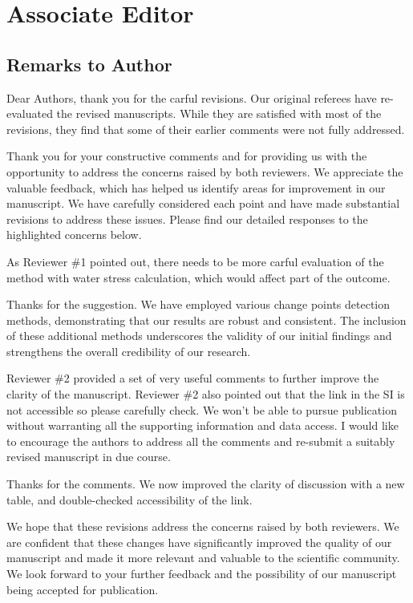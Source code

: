 \section*{Associate Editor}\label{editor}

\subsection{Remarks to Author}

\RC{} Dear Authors, thank you for the carful revisions. Our original referees have re-evaluated the revised manuscripts. While they are satisfied with most of the revisions, they find that some of their earlier comments were not fully addressed.

\AR{} Thank you for your constructive comments and for providing us with the opportunity to address the concerns raised by both reviewers. We appreciate the valuable feedback, which has helped us identify areas for improvement in our manuscript. We have carefully considered each point and have made substantial revisions to address these issues. Please find our detailed responses to the highlighted concerns below.

\RC{} As Reviewer \#1 pointed out, there needs to be more carful evaluation of the method with water stress calculation, which would affect part of the outcome.

\AR{} Thanks for the suggestion. We have employed various change points detection methods, demonstrating that our results are robust and consistent. The inclusion of these additional methods underscores the validity of our initial findings and strengthens the overall credibility of our research.

\RC{} Reviewer \#2 provided a set of very useful comments to further improve the clarity of the manuscript. Reviewer \#2 also pointed out that the link in the SI is not accessible so please carefully check. We won't be able to pursue publication without warranting all the supporting information and data access. I would like to encourage the authors to address all the comments and re-submit a suitably revised manuscript in due course.

\AR{} Thanks for the comments. We now improved the clarity of discussion with a new table, and double-checked accessibility of the link.

\AR*{} We hope that these revisions address the concerns raised by both reviewers. We are confident that these changes have significantly improved the quality of our manuscript and made it more relevant and valuable to the scientific community. We look forward to your further feedback and the possibility of our manuscript being accepted for publication.
